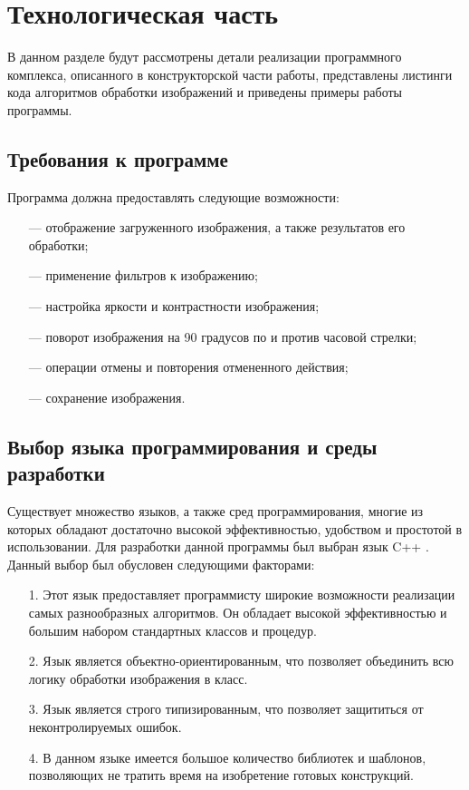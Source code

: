 \section{Технологическая часть}

В данном разделе будут рассмотрены детали реализации программного комплекса, описанного в конструкторской части работы, представлены листинги кода алгоритмов обработки изображений и приведены примеры работы программы.

\subsection{Требования к программе}

Программа должна предоставлять следующие возможности:

\begin{enumerate}[leftmargin=1.6\parindent]
	\item[---] отображение загруженного изображения, а также результатов его обработки;
	\item[---] применение фильтров к изображению;
	\item[---] настройка яркости и контрастности изображения;
	\item[---] поворот изображения на 90 градусов по и против часовой стрелки;
	\item[---] операции отмены и повторения отмененного действия;
	\item[---] сохранение изображения.
\end{enumerate}

\subsection{Выбор языка программирования и среды разработки}
Существует множество языков, а также сред программирования, многие из которых обладают достаточно высокой эффективностью, удобством
и простотой в использовании. Для разработки данной программы был выбран язык C++ \cite{cpp-lang}. Данный выбор был обусловен следующими факторами:

\begin{enumerate}[leftmargin=1.6\parindent]
	\item[1.] Этот язык предоставляет программисту широкие возможности реализации самых разнообразных алгоритмов. Он обладает высокой эффективностью и большим набором стандартных классов и процедур.
	\item[2.] Язык является объектно-ориентированным, что позволяет объединить всю логику обработки изображения в класс.
	\item[3.] Язык является строго типизированным, что позволяет защититься от
	неконтролируемых ошибок.
	\item[4.] В данном языке имеется большое количество библиотек и шаблонов,
	позволяющих не тратить время на изобретение готовых конструкций.
\end{enumerate}

